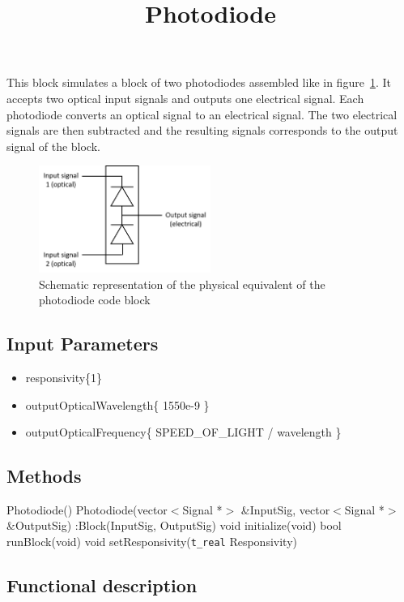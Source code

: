 \documentclass[a4paper]{article}
\title{Photodiode}
\begin{document}
\maketitle

This block simulates a block of two photodiodes assembled like in figure~\ref{photodiode}. It accepts two optical input signals and outputs one electrical signal. Each photodiode converts an optical signal to an electrical signal. The two electrical signals are then subtracted and the resulting signals corresponds to the output signal of the block.

\begin{figure}[h]
	\centering\includegraphics[width=0.5\textwidth]{photodiode.png}
	\caption{Schematic representation of the physical equivalent of the photodiode code block}\label{photodiode}
\end{figure}

\subsection*{Input Parameters}

\begin{itemize}
	\item responsivity\{1\}
	\item outputOpticalWavelength\{ 1550e-9 \}
	\item outputOpticalFrequency\{ SPEED\_OF\_LIGHT / wavelength \}
\end{itemize}

\subsection*{Methods}
 
Photodiode() {}
\bigbreak
Photodiode(vector$<$Signal *$>$ \&InputSig, vector$<$Signal *$>$ \&OutputSig) :Block(InputSig, OutputSig) {}
\bigbreak
void initialize(void)
\bigbreak
bool runBlock(void)
\bigbreak
void setResponsivity(\texttt{t\_real} Responsivity)

\subsection*{Functional description}
\end{document}

